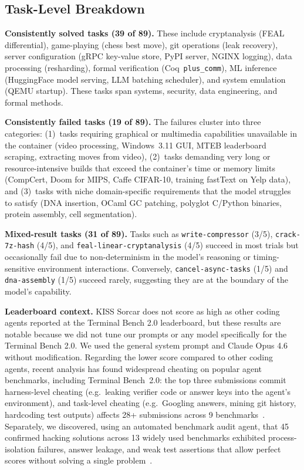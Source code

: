 \documentclass{article}
\begin{document}
\subsection{Task-Level Breakdown}

\textbf{Consistently solved tasks (39 of 89).} These include cryptanalysis (FEAL differential), game-playing (chess best move), git operations (leak recovery), server configuration (gRPC key-value store, PyPI server, NGINX logging), data processing (resharding), formal verification (Coq~\texttt{plus\_comm}), ML inference (HuggingFace model serving, LLM batching scheduler), and system emulation (QEMU startup).  These tasks span systems, security, data engineering, and formal methods.

\textbf{Consistently failed tasks (19 of 89).} The failures cluster into three categories: (1)~tasks requiring graphical or multimedia capabilities unavailable in the container (video processing, Windows~3.11 GUI, MTEB leaderboard scraping, extracting moves from video), (2)~tasks demanding very long or resource-intensive builds that exceed the container's time or memory limits (CompCert, Doom for MIPS, Caffe CIFAR-10, training fastText on Yelp data), and (3)~tasks with niche domain-specific requirements that the model struggles to satisfy (DNA insertion, OCaml GC patching, polyglot C/Python binaries, protein assembly, cell segmentation).

\textbf{Mixed-result tasks (31 of 89).} Tasks such as \texttt{write-compressor} (3/5), \texttt{crack-7z-hash} (4/5), and \texttt{feal-linear-cryptanalysis} (4/5) succeed in most trials but occasionally fail due to non-determinism in the model's reasoning or timing-sensitive environment interactions.  Conversely, \texttt{cancel-async-tasks} (1/5) and \texttt{dna-assembly} (1/5) succeed rarely, suggesting they are at the boundary of the model's capability.

\textbf{Leaderboard context.}  KISS Sorcar does not score as high as other coding agents reported at the Terminal Bench 2.0 leaderboard, but these results are notable because we did not tune our prompts or any model specifically for the Terminal Bench 2.0.  We used the general system prompt and Claude Opus 4.6 without modification.  Regarding the lower score compared to other coding agents, recent analysis has found widespread cheating on popular agent benchmarks, including Terminal Bench~2.0: the top three submissions commit harness-level cheating (e.g.\ leaking verifier code or answer keys into the agent's environment), and task-level cheating (e.g.\ Googling answers, mining git history, hardcoding test outputs) affects 28+ submissions across 9 benchmarks~\citep{stein2026cheatingblog,stein2026detecting}. Separately, we discovered, using an automated benchmark audit agent, that 45 confirmed hacking solutions across 13 widely used benchmarks exhibited process-isolation failures, answer leakage, and weak test assertions that allow perfect scores without solving a single problem~\citep{wang2026trustworthyblog}.
\end{document}
